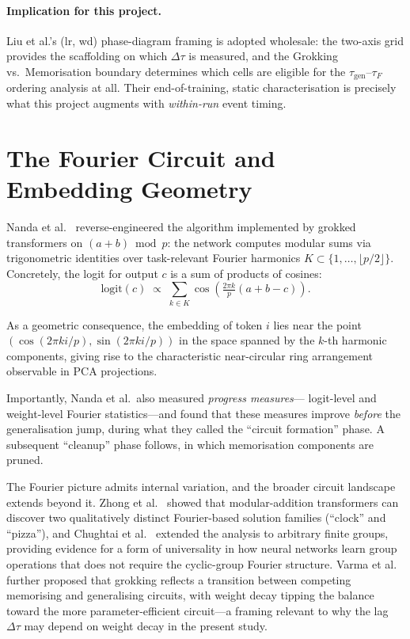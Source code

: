 \documentclass[12pt,openany,oneside,a4paper]{book}
\newcommand{\taug}{\tau_{\mathrm{gen}}}
\newcommand{\tauf}{\tau_{F}}
\newcommand{\Dtau}{\Delta\tau}
\begin{document}
\paragraph{Implication for this project.}
Liu et al.'s (lr, wd) phase-diagram framing is adopted wholesale:
the two-axis grid provides the scaffolding on which $\Dtau$ is
measured, and the Grokking vs.\ Memorisation boundary determines
which cells are eligible for the $\taug$--$\tauf$ ordering analysis
at all.
Their end-of-training, static characterisation is precisely what
this project augments with \emph{within-run} event timing.

\section[The Fourier Circuit and Embedding Geometry]{The Fourier Circuit and\\ Embedding Geometry}

Nanda et al.\ \cite{nanda2023progress} reverse-engineered the
algorithm implemented by grokked transformers on $(a+b)\bmod p$:
the network computes modular sums via trigonometric identities
over task-relevant Fourier harmonics $K\subset\{1,\dots,\lfloor
p/2\rfloor\}$.
Concretely, the logit for output $c$ is a sum of products of cosines:
\[
  \mathrm{logit}(c) \;\propto\; \sum_{k\in K}
    \cos\!\left(\tfrac{2\pi k}{p}(a+b-c)\right).
\]
{\sloppy
As a geometric consequence, the embedding of token $i$ lies near
the point $(\cos(2\pi ki/p),\sin(2\pi ki/p))$ in the space spanned
by the $k$-th harmonic components, giving rise to the characteristic
near-circular ring arrangement observable in PCA projections.\par}

Importantly, Nanda et al.\ also measured \emph{progress measures}---
logit-level and weight-level Fourier statistics---and found that these
measures improve \emph{before} the generalisation jump, during what
they called the ``circuit formation'' phase.
A subsequent ``cleanup'' phase follows, in which memorisation
components are pruned.

The Fourier picture admits internal variation, and the broader
circuit landscape extends beyond it.
Zhong et al.\ \cite{zhong2023clock} showed that modular-addition
transformers can discover two qualitatively distinct Fourier-based
solution families (``clock'' and ``pizza''), and Chughtai et al.\
\cite{chughtai2023toy} extended the analysis to arbitrary finite
groups, providing evidence for a form of universality in how
neural networks learn group operations that does not require the
cyclic-group Fourier structure.
Varma et al.\ \cite{varma2023explaining} further proposed that grokking
reflects a transition between competing memorising and generalising
circuits, with weight decay tipping the balance toward the more
parameter-efficient circuit---a framing relevant to why the lag
$\Dtau$ may depend on weight decay in the present study.
\end{document}
